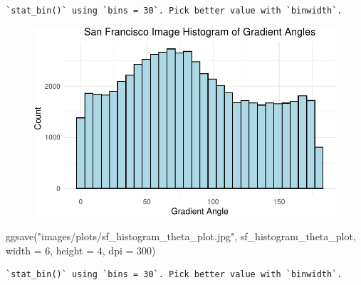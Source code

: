 \documentclass[
  letterpaper,
]{report}
\newenvironment{Shaded}{\begin{snugshade}}{\end{snugshade}}
\newcommand{\AttributeTok}[1]{\textcolor[rgb]{0.40,0.45,0.13}{#1}}
\newcommand{\DecValTok}[1]{\textcolor[rgb]{0.68,0.00,0.00}{#1}}
\newcommand{\FunctionTok}[1]{\textcolor[rgb]{0.28,0.35,0.67}{#1}}
\newcommand{\NormalTok}[1]{\textcolor[rgb]{0.00,0.23,0.31}{#1}}
\newcommand{\StringTok}[1]{\textcolor[rgb]{0.13,0.47,0.30}{#1}}
\begin{document}
\begin{verbatim}
`stat_bin()` using `bins = 30`. Pick better value with `binwidth`.
\end{verbatim}

\begin{figure}[H]

{\centering \includegraphics{results_files/figure-pdf/unnamed-chunk-10-2.pdf}

}

\end{figure}

\begin{Shaded}
\begin{Highlighting}[]
\FunctionTok{ggsave}\NormalTok{(}\StringTok{"images/plots/sf\_histogram\_theta\_plot.jpg"}\NormalTok{, sf\_histogram\_theta\_plot, }\AttributeTok{width =} \DecValTok{6}\NormalTok{, }\AttributeTok{height =} \DecValTok{4}\NormalTok{, }\AttributeTok{dpi =} \DecValTok{300}\NormalTok{)}
\end{Highlighting}
\end{Shaded}

\begin{verbatim}
`stat_bin()` using `bins = 30`. Pick better value with `binwidth`.
\end{verbatim}
\end{document}

